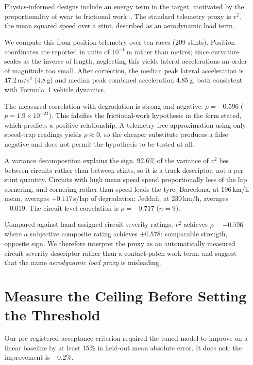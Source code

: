 \documentclass[conference]{IEEEtran}
\begin{document}
Physics-informed designs include an energy term in the target, motivated by the
proportionality of wear to frictional work~\cite{archard1953}. The standard
telemetry proxy is $\overline{v^2}$, the mean squared speed over a stint,
described as an aerodynamic load term.

We compute this from position telemetry over ten races (209 stints). Position
coordinates are reported in units of $10^{-1}$\,m rather than metres; since
curvature scales as the inverse of length, neglecting this yields lateral
accelerations an order of magnitude too small. After correction, the median
peak lateral acceleration is 47.2\,m/s$^2$ (4.8\,g) and median peak combined
acceleration 4.85\,g, both consistent with Formula~1 vehicle dynamics.

The measured correlation with degradation is strong and negative:
$\rho = -0.596$ ($p = 1.9 \times 10^{-21}$). This falsifies the frictional-work
hypothesis in the form stated, which predicts a positive relationship. A
telemetry-free approximation using only speed-trap readings yields
$\rho \approx 0$, so the cheaper substitute produces a false negative and does
not permit the hypothesis to be tested at all.

A variance decomposition explains the sign. 92.6\% of the variance of
$\overline{v^2}$ lies between circuits rather than between stints, so it is a
track descriptor, not a per-stint quantity. Circuits with high mean speed spend
proportionally less of the lap cornering, and cornering rather than speed loads
the tyre. Barcelona, at 196\,km/h mean, averages $+0.117$\,s/lap of degradation;
Jeddah, at 230\,km/h, averages $+0.019$. The circuit-level correlation is
$\rho = -0.717$ ($n=9$).

Compared against hand-assigned circuit severity ratings, $\overline{v^2}$
achieves $\rho = -0.596$ where a subjective composite rating achieves
$+0.578$: comparable strength, opposite sign. We therefore interpret the proxy
as an automatically measured circuit severity descriptor rather than a
contact-patch work term, and suggest that the name \emph{aerodynamic load
proxy} is misleading.

\section{Measure the Ceiling Before Setting the Threshold}
\label{sec:ceiling}

Our pre-registered acceptance criterion required the tuned model to improve on
a linear baseline by at least 15\% in held-out mean absolute error. It does
not: the improvement is $-0.2\%$.
\end{document}
